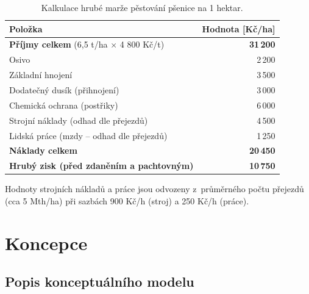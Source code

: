 \documentclass[11pt,a4paper]{article}
\begin{document}
\begin{table}[H]
    \centering
    \begin{threeparttable}
        \setlength{\tabcolsep}{6pt}
        \renewcommand{\arraystretch}{1.2}
        \small
        \begin{tabularx}{\linewidth}{@{}Xr@{}}
            \toprule
            Položka & Hodnota [Kč/ha] \\ \midrule
            \textbf{Příjmy celkem} (6,5 t/ha $\times$ 4 800 Kč/t) & \textbf{31\,200} \\
            \midrule
            Osivo & 2\,200 \\
            Základní hnojení & 3\,500 \\
            Dodatečný dusík (přihnojení) & 3\,000 \\
            Chemická ochrana (postřiky) & 6\,000 \\
            Strojní náklady (odhad dle přejezdů)\tnote{1} & 4\,500 \\
            Lidská práce (mzdy -- odhad dle přejezdů)\tnote{1} & 1\,250 \\
            \textbf{Náklady celkem} & \textbf{20\,450} \\
            \midrule
            \textbf{Hrubý zisk (před zdaněním a pachtovným)} & \textbf{10\,750} \\
            \bottomrule
        \end{tabularx}
        \begin{tablenotes}[flushleft]
            \footnotesize
            \item[1] Hodnoty strojních nákladů a práce jsou odvozeny z~průměrného počtu přejezdů (cca 5 Mth/ha) při sazbách 900 Kč/h (stroj) a 250 Kč/h (práce).
        \end{tablenotes}
    \end{threeparttable}
    \caption{Kalkulace hrubé marže pěstování pšenice na 1 hektar.}
    \label{tab:ekonomika-ha}
\end{table}

\section{Koncepce}

\subsection{Popis konceptuálního modelu}\label{popis-konceptualniho-modelu}
\end{document}
